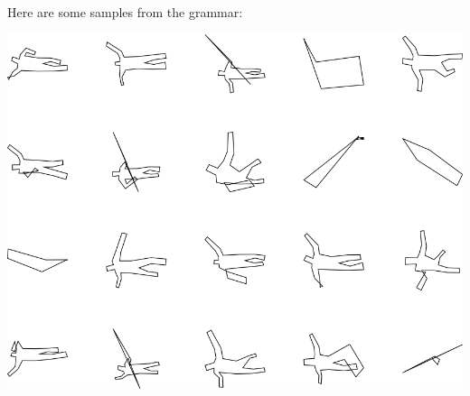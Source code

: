 Here are some samples from the grammar:

\includegraphics[width=6in]{output/3.learning/sdf_tuning/gram.2.d/samples.png}

